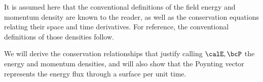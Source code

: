 %
%

It is assumed here that the conventional definitions of the field energy and momentum density are known to the reader, as well as the
conservation equations relating their space and time derivatives.  For reference, the conventional definitions of those densities follow.
\index{\(\calE\)}
\index{\(\BS\)}
\index{\(\bcP\)}

We will derive the conservation relationships that justify calling \( \calE, \bcP \) the energy and momentum densities, and will also show that the
Poynting vector represents the energy flux through a surface per unit time.

